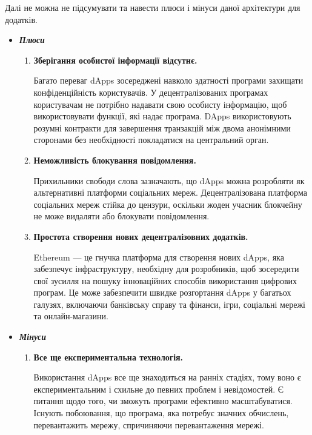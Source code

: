 Далі не можна не підсумувати та навести плюси і мінуси даної архітектури для додатків.
\begin{itemize}
    \item \textbf{\textit{Плюси}}
        \begin{enumerate}
            \item \textbf{Зберігання особистої інформації відсутнє.} 
            
            Багато переваг dApps зосереджені навколо здатності програми захищати конфіденційність користувачів. У децентралізованих програмах користувачам не потрібно надавати свою особисту інформацію, щоб використовувати функції, які надає програма. DApps використовують розумні контракти для завершення транзакцій між двома анонімними сторонами без необхідності покладатися на центральний орган.
            
            \item \textbf{Неможливість блокування повідомлення.}
            
            Прихильники свободи слова зазначають, що dApps можна розробляти як альтернативні платформи соціальних мереж. Децентралізована платформа соціальних мереж стійка до цензури, оскільки жоден учасник блокчейну не може видаляти або блокувати повідомлення.
            
            \item \textbf{Простота створення нових децентралізовних додатків.}
            
            Ethereum — це гнучка платформа для створення нових dApps, яка забезпечує інфраструктуру, необхідну для розробників, щоб зосередити свої зусилля на пошуку інноваційних способів використання цифрових програм. Це може забезпечити швидке розгортання dApps у багатьох галузях, включаючи банківську справу та фінанси, ігри, соціальні мережі та онлайн-магазини.
        \end{enumerate}
    \item \textbf{\textit{Мінуси}}
        \begin{enumerate}
            \item \textbf{Все ще експериментальна технологія.}

            Використання dApps все ще знаходиться на ранніх стадіях, тому воно є експериментальним і схильне до певних проблем і невідомостей. Є питання щодо того, чи зможуть програми ефективно масштабуватися. Існують побоювання, що програма, яка потребує значних обчислень, перевантажить мережу, спричиняючи перевантаження мережі.
            

\end{enumerate}
\end{itemize}
